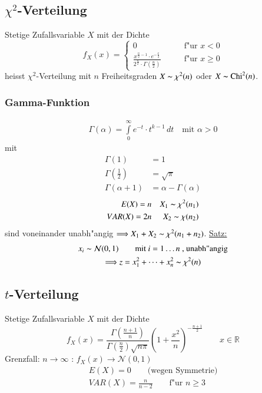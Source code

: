 \subsection{$\chi^2$-Verteilung}
Stetige Zufallsvariable $X$ mit der Dichte
\begin{equation}
	f_X(x)=\begin{cases}
		0 \qquad & \text{f"ur } x<0 \\
		\frac{x^{\frac{n}{2}-1}\cdot e^{-\frac{x}{2}}}{2^{\frac{n}{2}}\cdot\Gamma\left(\frac{n}{2}\right)} \qquad & \text{f"ur } x\geq 0
	\end{cases}
\end{equation}
heisst $\chi^2$-Verteilung mit $n$ Freiheitsgraden $X\thicksim\chi^2(n)$ oder $X\thicksim\mathrm{Chi}^2(n)$.

\subsubsection{Gamma-Funktion}
\begin{gather}
	\Gamma(\alpha) = \int\limits_0^\infty e^{-t}\cdot t^{k-1}\,dt\quad\text{mit }\alpha>0
\end{gather}
mit
\begin{align*}
	\Gamma(1) &=1 \\
	\Gamma\left(\frac{1}{2}\right) &= \sqrt{\pi} \\
	\Gamma(\alpha+1) &= \alpha-\Gamma(\alpha)	
\end{align*}
\begin{align*}
	E(X)=n && X_1\thicksim\chi^2(n_1) \\
	VAR(X)=2n && X_2\thicksim\chi(n_2)
\end{align*}
sind voneinander unabh"angig $\Longrightarrow X_1+X_2\thicksim\chi^2(n_1+n_2)$.
\newline
\newline
\underline{Satz:}
\begin{gather}
	x_i\thicksim\mathcal{N}(0,1)\qquad\text{mit }i=1\ldots n\text{ , unabh"angig} \notag \\
	\Longrightarrow z=x_1^2 + \cdots + x_n^2 \thicksim\chi^2(n)
\end{gather}

\subsection{$t$-Verteilung}
Stetige Zufallsvariable $X$ mit der Dichte
\begin{equation}
	f_X(x)=\frac{\Gamma(\frac{n+1}{n})}{\Gamma(\frac{n}{2})\sqrt{n\pi}}\left({1+\frac{x^2}{n}}\right)^{-\frac{n+1}{2}}\qquad x\in\mathbb{R}
\end{equation}
Grenzfall: $n\to\infty$ : $f_X(x)\rightarrow\mathcal{N}(0,1)$
\begin{gather*}
	E(X)= 0\qquad\text{(wegen Symmetrie)} \\
	VAR(X)=\frac{n}{n-2}\qquad\text{f"ur }n\geq 3
\end{gather*}

